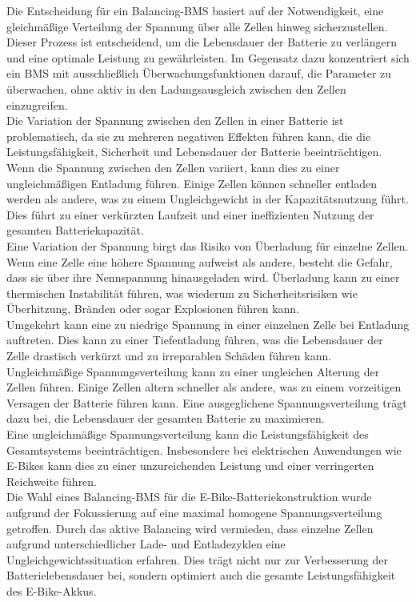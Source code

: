 Die Entscheidung für ein Balancing-BMS basiert auf der Notwendigkeit, eine gleichmäßige Verteilung der Spannung über alle Zellen hinweg sicherzustellen. Dieser Prozess ist entscheidend, um die Lebensdauer der Batterie zu verlängern und eine optimale Leistung zu gewährleisten. Im Gegensatz dazu konzentriert sich ein BMS mit ausschließlich Überwachungsfunktionen darauf, die Parameter zu überwachen, ohne aktiv in den Ladungsausgleich zwischen den Zellen einzugreifen.\\
Die Variation der Spannung zwischen den Zellen in einer Batterie ist problematisch, da sie zu mehreren negativen Effekten führen kann, die die Leistungsfähigkeit, Sicherheit und Lebensdauer der Batterie beeinträchtigen.\\

Wenn die Spannung zwischen den Zellen variiert, kann dies zu einer ungleichmäßigen Entladung führen. Einige Zellen können schneller entladen werden als andere, was zu einem Ungleichgewicht in der Kapazitätsnutzung führt. Dies führt zu einer verkürzten Laufzeit und einer ineffizienten Nutzung der gesamten Batteriekapazität.\\

Eine Variation der Spannung birgt das Risiko von Überladung für einzelne Zellen. Wenn eine Zelle eine höhere Spannung aufweist als andere, besteht die Gefahr, dass sie über ihre Nennspannung hinausgeladen wird. Überladung kann zu einer thermischen Instabilität führen, was wiederum zu Sicherheitsrisiken wie Überhitzung, Bränden oder sogar Explosionen führen kann.\\

Umgekehrt kann eine zu niedrige Spannung in einer einzelnen Zelle bei Entladung auftreten. Dies kann zu einer Tiefentladung führen, was die Lebensdauer der Zelle drastisch verkürzt und zu irreparablen Schäden führen kann.\\

Ungleichmäßige Spannungsverteilung kann zu einer ungleichen Alterung der Zellen führen. Einige Zellen altern schneller als andere, was zu einem vorzeitigen Versagen der Batterie führen kann. Eine ausgeglichene Spannungsverteilung trägt dazu bei, die Lebensdauer der gesamten Batterie zu maximieren.\\

Eine ungleichmäßige Spannungsverteilung kann die Leistungsfähigkeit des Gesamtsystems beeinträchtigen. Insbesondere bei elektrischen Anwendungen wie E-Bikes kann dies zu einer unzureichenden Leistung und einer verringerten Reichweite führen.\\
Die Wahl eines Balancing-BMS für die E-Bike-Batteriekonstruktion wurde aufgrund der Fokussierung auf eine maximal homogene Spannungsverteilung getroffen. Durch das aktive Balancing wird vermieden, dass einzelne Zellen aufgrund unterschiedlicher Lade- und Entladezyklen eine Ungleichgewichtssituation erfahren. Dies trägt nicht nur zur Verbesserung der Batterielebensdauer bei, sondern optimiert auch die gesamte Leistungsfähigkeit des E-Bike-Akkus.\\

